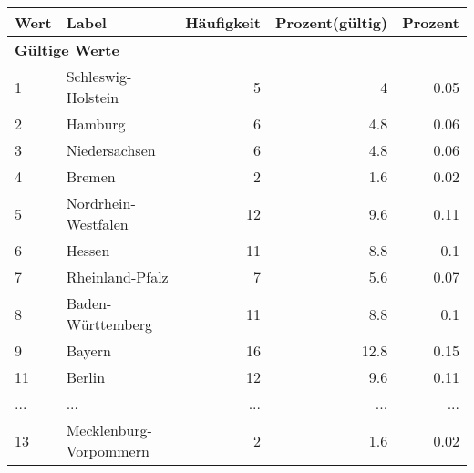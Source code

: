      \begin{longtable}{lXrrr}
     \toprule
     \textbf{Wert} & \textbf{Label} & \textbf{Häufigkeit} & \textbf{Prozent(gültig)} & \textbf{Prozent} \\
     \endhead
     \midrule
     \multicolumn{5}{l}{\textbf{Gültige Werte}}\\
        1 & \multicolumn{1}{X}{Schleswig-Holstein} & %
          \num{5} &
          \num[round-mode=places,round-precision=2]{4} &
          \num[round-mode=places,round-precision=2]{0.05} \\
        2 & \multicolumn{1}{X}{Hamburg} & %
          \num{6} &
          \num[round-mode=places,round-precision=2]{4.8} &
          \num[round-mode=places,round-precision=2]{0.06} \\
        3 & \multicolumn{1}{X}{Niedersachsen} & %
          \num{6} &
          \num[round-mode=places,round-precision=2]{4.8} &
          \num[round-mode=places,round-precision=2]{0.06} \\
        4 & \multicolumn{1}{X}{Bremen} & %
          \num{2} &
          \num[round-mode=places,round-precision=2]{1.6} &
          \num[round-mode=places,round-precision=2]{0.02} \\
        5 & \multicolumn{1}{X}{Nordrhein-Westfalen} & %
          \num{12} &
          \num[round-mode=places,round-precision=2]{9.6} &
          \num[round-mode=places,round-precision=2]{0.11} \\
        6 & \multicolumn{1}{X}{Hessen} & %
          \num{11} &
          \num[round-mode=places,round-precision=2]{8.8} &
          \num[round-mode=places,round-precision=2]{0.1} \\
        7 & \multicolumn{1}{X}{Rheinland-Pfalz} & %
          \num{7} &
          \num[round-mode=places,round-precision=2]{5.6} &
          \num[round-mode=places,round-precision=2]{0.07} \\
        8 & \multicolumn{1}{X}{Baden-Württemberg} & %
          \num{11} &
          \num[round-mode=places,round-precision=2]{8.8} &
          \num[round-mode=places,round-precision=2]{0.1} \\
        9 & \multicolumn{1}{X}{Bayern} & %
          \num{16} &
          \num[round-mode=places,round-precision=2]{12.8} &
          \num[round-mode=places,round-precision=2]{0.15} \\
        11 & \multicolumn{1}{X}{Berlin} & %
          \num{12} &
          \num[round-mode=places,round-precision=2]{9.6} &
          \num[round-mode=places,round-precision=2]{0.11} \\
       ... & ... & ... & ... & ... \\
        13 & \multicolumn{1}{X}{Mecklenburg-Vorpommern} & %
          \num{2} &
          \num[round-mode=places,round-precision=2]{1.6} &
          \num[round-mode=places,round-precision=2]{0.02} \\


\end{longtable}
